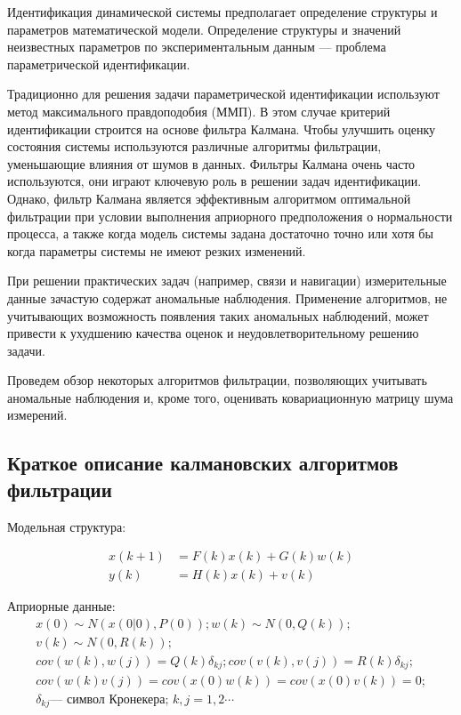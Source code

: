 \documentclass[a4paper,12pt]{article}
\begin{document}
Идентификация динамической системы предполагает определение структуры и
параметров математической модели. Определение структуры и значений
неизвестных параметров по экспериментальным данным --- проблема параметрической
идентификации.

Традиционно для решения задачи параметрической идентификации используют метод
максимального правдоподобия (ММП). В этом случае критерий идентификации
строится на основе фильтра Калмана. Чтобы улучшить оценку состояния системы
используются различные алгоритмы фильтрации, уменьшающие влияния от шумов
в данных. Фильтры Калмана очень часто используются, они играют ключевую роль
в решении задач идентификации. Однако, фильтр Калмана является эффективным
алгоритмом оптимальной фильтрации при условии выполнения априорного
предположения о нормальности процесса, а также когда модель системы задана
достаточно точно или хотя бы когда параметры системы не имеют резких изменений.

При решении практических задач (например, связи и навигации) измерительные
данные зачастую содержат аномальные наблюдения. Применение алгоритмов, не
учитывающих возможность появления таких аномальных наблюдений, может привести
к ухудшению качества оценок и неудовлетворительному решению задачи.

Проведем обзор некоторых алгоритмов фильтрации, позволяющих учитывать
аномальные наблюдения и, кроме того, оценивать ковариационную матрицу шума
измерений.

\subsection{Краткое описание калмановских алгоритмов фильтрации}

Модельная структура:

\[
	\begin{array}{cl}
		x(k+1) &= F(k) x(k) + G(k) w(k)\\
		y(k)   &= H(k) x(k) + v(k)
	\end{array}
\]

Априорные данные:\\
\[
\begin{array}{l}
	x(0) \sim N(x(0|0), P(0)); w(k) \sim N(0, Q(k));\\
	v(k) \sim N(0, R(k)); \\
	cov(w(k), w(j)) = Q(k) \delta_{kj}; cov(v(k), v(j)) = R(k) \delta_{kj}; \\
	cov(w(k) v(j)) = cov(x(0)w(k)) = cov(x(0)v(k)) = 0; \\
	\delta_{kj} \mbox{--- символ Кронекера; $k, j = 1, 2\cdots$}
\end{array}
\]
\end{document}
